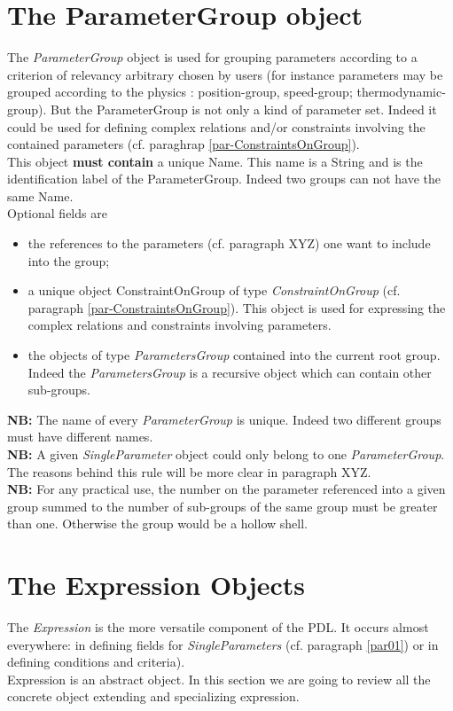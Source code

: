 \documentclass[a4paper,11pt] {article}
\begin{document}
\section{The ParameterGroup object}\label{par-group}
The {\it ParameterGroup} object is used for grouping parameters according to a criterion of relevancy arbitrary chosen by users (for instance parameters may be grouped according to the physics : position-group, speed-group; thermodynamic-group).
But  the ParameterGroup is not only a kind of parameter set. Indeed it could be used for defining complex relations and/or constraints involving the contained parameters (cf. paraghrap \ref{par-ConstraintsOnGroup}).\\
This object {\bf must contain} a unique Name. This name is a String and is the identification label of the ParameterGroup. Indeed two groups can not have the same Name.\\
Optional fields are
\begin{itemize}
\item the references to the parameters (cf. paragraph XYZ) one want to include into the group;
\item a unique object ConstraintOnGroup of type {\it ConstraintOnGroup} (cf. paragraph  \ref{par-ConstraintsOnGroup}). This object is used for 
expressing the complex relations and constraints involving parameters.
\item the objects of type {\it ParametersGroup} contained into the current root group. Indeed the {\it ParametersGroup} is a recursive object which can contain other sub-groups.
\end{itemize}

{\bf NB:} The name of every {\it ParameterGroup} is unique. Indeed two different groups must have different names.\\

{\bf NB:} A given {\it SingleParameter} object could only belong to one {\it ParameterGroup}. The reasons behind this rule will be more clear in paragraph XYZ.\\

{\bf NB:}  For any practical use, the number on the parameter referenced into a given group summed to the number of sub-groups of the same group must be greater than one. Otherwise the group would be a hollow shell.


\section{The Expression Objects}\label{par02}
The {\it Expression} is the more versatile component of the PDL. It occurs almost everywhere: in defining fields for {\it SingleParameters} (cf. paragraph \ref{par01}) or in defining conditions and criteria).\\
Expression is an abstract object. In this section we are going to review all the concrete object extending and specializing expression.\\
\end{document}
